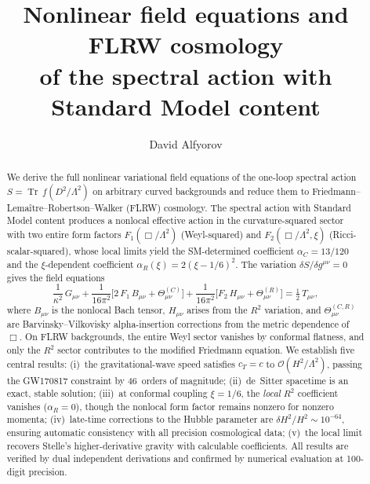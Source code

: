 \documentclass[12pt,a4paper]{article}
\newcommand{\Tr}{\operatorname{Tr}}
\newcommand{\order}{\mathcal{O}}
\newcommand{\Lam}{\Lambda}
\theoremstyle{plain}
\theoremstyle{definition}
\begin{document}
\title{Nonlinear field equations and FLRW cosmology\\
of the spectral action with Standard Model content}

\author{David Alfyorov}

\date{}

\maketitle

\begin{abstract}
We derive the full nonlinear variational field equations of the one-loop
spectral action $S = \Tr\,f(D^2/\Lam^2)$ on arbitrary curved backgrounds and
reduce them to Friedmann--Lema\^itre--Robertson--Walker (FLRW) cosmology.
The spectral action with Standard Model content produces a nonlocal effective
action in the curvature-squared sector with two entire form factors
$F_1(\Box/\Lam^2)$ (Weyl-squared) and $F_2(\Box/\Lam^2,\xi)$
(Ricci-scalar-squared), whose local limits yield the SM-determined coefficient
$\alpha_C = 13/120$ and the $\xi$-dependent coefficient
$\alpha_R(\xi) = 2(\xi - 1/6)^2$.
The variation $\delta S/\delta g^{\mu\nu} = 0$ gives the field equations
\begin{equation*}
  \frac{1}{\kappa^2}\,G_{\mu\nu}
  + \frac{1}{16\pi^2}\bigl[2\,F_1\,B_{\mu\nu}
    + \Theta^{(C)}_{\mu\nu}\bigr]
  + \frac{1}{16\pi^2}\bigl[F_2\,H_{\mu\nu}
    + \Theta^{(R)}_{\mu\nu}\bigr]
  = \tfrac{1}{2}\,T_{\mu\nu},
\end{equation*}
where $B_{\mu\nu}$ is the nonlocal Bach tensor, $H_{\mu\nu}$ arises from the
$R^2$ variation, and $\Theta^{(C,R)}_{\mu\nu}$ are Barvinsky--Vilkovisky
alpha-insertion corrections from the metric dependence of $\Box$.
On FLRW backgrounds, the entire Weyl sector vanishes by conformal flatness, and
only the $R^2$ sector contributes to the modified Friedmann equation.
We establish five central results:
(i)~the gravitational-wave speed satisfies $c_T = c$ to
$\order(H^2/\Lam^2)$, passing the GW170817 constraint by 46~orders
of magnitude;
(ii)~de~Sitter spacetime is an exact, stable solution;
(iii)~at conformal coupling $\xi = 1/6$, the \emph{local} $R^2$ coefficient
vanishes ($\alpha_R = 0$), though the nonlocal form factor remains nonzero
for nonzero momenta;
(iv)~late-time corrections to the Hubble parameter are
$\delta H^2/H^2 \sim 10^{-64}$, ensuring automatic consistency with all
precision cosmological data;
(v)~the local limit recovers Stelle's higher-derivative gravity with
calculable coefficients.
All results are verified by dual independent derivations and confirmed by
numerical evaluation at 100-digit precision.
\end{abstract}
\end{document}
